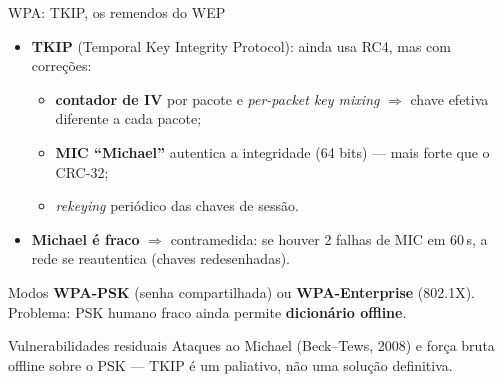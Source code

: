 \documentclass[aspectratio=169,11pt]{beamer}
\begin{document}
\begin{frame}{WPA: TKIP, os remendos do WEP}
  \begin{itemize}
    \item \textbf{TKIP} (Temporal Key Integrity Protocol): ainda usa RC4, mas com correções:
      \begin{itemize}
        \item \textbf{contador de IV} por pacote e \emph{per-packet key mixing} $\Rightarrow$ chave efetiva diferente a cada pacote;
        \item \textbf{MIC ``Michael''} autentica a integridade (64 bits) --- mais forte que o CRC-32;
        \item \emph{rekeying} periódico das chaves de sessão.
      \end{itemize}
    \item \textbf{Michael é fraco} $\Rightarrow$ contramedida: se houver 2 falhas de MIC em 60\,s, a rede se reautentica (chaves redesenhadas).
  \end{itemize}
  \begin{block}{Modos}
    \textbf{WPA-PSK} (senha compartilhada) ou \textbf{WPA-Enterprise} (802.1X). Problema: PSK humano fraco ainda permite \textbf{dicionário offline}.
  \end{block}
  \begin{alertblock}{Vulnerabilidades residuais}
    Ataques ao Michael (Beck--Tews, 2008) e força bruta offline sobre o PSK --- TKIP é um paliativo, não uma solução definitiva.
  \end{alertblock}
\end{frame}
\end{document}
